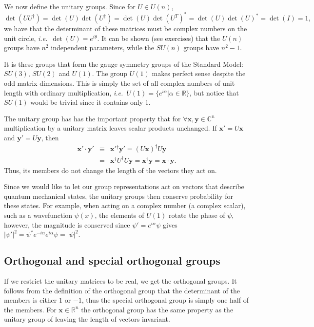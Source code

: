 \documentclass[notes.tex]{subfiles}
\begin{document}
We now define the unitary groups.
Since for $U\in U(n)$,
\[\det(UU^\dagger)=\det(U)\det(U^\dagger)=\det(U)\det(U^T)^*=\det(U)\det(U)^*=\det(I)=1,\] 
we have that the determinant of these matrices must be complex numbers on the unit circle, {\it i.e.}\ $\det(U)=e^{i\theta}$.
It can be shown (see exercises) that the $U(n)$ groups have $n^2$ independent parameters, while the $SU(n)$ groups have $n^2-1$.

It is these groups that form the gauge symmetry groups of the Standard Model: $SU(3)$, $SU(2)$ and $U(1)$. The group $U(1)$ makes perfect sense despite the odd matrix dimensions. This is simply the set of all complex numbers of unit length with ordinary multiplication, {\it i.e.}\ $U(1)=\{e^{i\alpha} | \alpha \in\mathbb{R} \}$, but notice that $SU(1)$ would be trivial since it contains only 1. 

The unitary group has has the important property that for $\forall \mathbf{x}, \mathbf{y} \in \mathbb{C}^n$ multiplication by  a unitary matrix leaves scalar products unchanged. If $\mathbf{x}'=U\mathbf{x}$ and $\mathbf{y}'=U\mathbf{y}$, then
\begin{eqnarray}
\mathbf{x}'\cdot \mathbf{y}' &\equiv& \mathbf{x}'{}^\dagger \mathbf{y}' = (U\mathbf{x})^\dagger U\mathbf{y}\nonumber\\
&=& \mathbf{x}^\dagger U^\dagger U\mathbf{y} = \mathbf{x}^\dagger \mathbf{y} = \mathbf{x} \cdot \mathbf{y}.\nonumber
\end{eqnarray}
Thus, its members do not change the length of the vectors they act on. 

Since we would like to let our group representations act on vectors that describe quantum mechanical states, the unitary groups then conserve probability for these states. For example, when acting on a complex number (a complex scalar), such as a wavefunction $\psi(x)$, the elements of $U(1)$ rotate the phase of $\psi$, however, the magnitude is conserved since $\psi'=e^{i\alpha}\psi$ gives $|\psi'|^2=\psi^*e^{-i\alpha}e^{i\alpha}\psi=|\psi|^2$.


\subsection{Orthogonal and special orthogonal groups}
If we restrict the unitary matrices to be real, we get the orthogonal groups.
It follows from the definition of the orthogonal group that the determinant of the members is either 1 or $-1$, thus the special orthogonal group is simply one half of the members. For $\mathbf{x} \in \mathbb{R}^n$ the orthogonal group has the same property as the unitary group of leaving the length of vectors invariant. 
\end{document}
